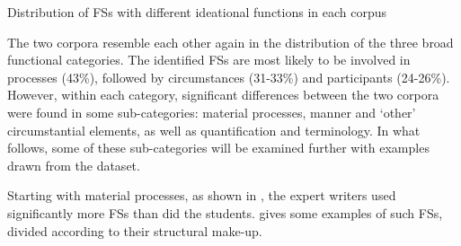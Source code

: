 \begin{table}
\caption{Distribution of FSs with different ideational functions in each corpus}
\label{tab:key:4}
\end{table}

The two corpora resemble each other again in the distribution of the three broad functional categories. The identified FSs are most likely to be involved in processes (43\%), followed by circumstances (31-33\%) and participants (24-26\%). However, within each category, significant differences between the two corpora were found in some sub-categories: material processes, manner and ‘other’ circumstantial elements, as well as quantification and terminology. In what follows, some of these sub-categories will be examined further with examples drawn from the dataset. 

Starting with material processes, as shown in , the expert writers used significantly more FSs than did the students.  gives some examples of such FSs, divided according to their structural make-up. 


